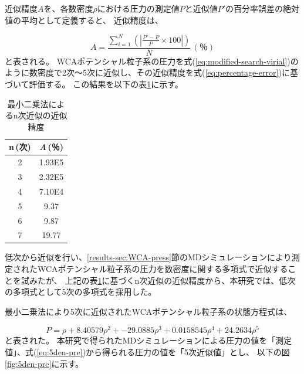 \documentclass[titlepage]{jsreport}
\begin{document}
{{{近似精度$A$を、各数密度$\rho$における圧力の測定値$P$と近似値$P'$の百分率誤差の絶対値の平均として定義すると、
近似精度は、

\large
\begin{equation}
    A=\frac{\sum_{i=1}^N\left(|\frac{P'-P}{P}\times100|\right)}{N}\,(％)\label{eq:percentage-error}
\end{equation}
\normalsize
と表される。
WCAポテンシャル粒子系の圧力を式(\ref{eq:modified-search-virial})のように数密度で2次〜5次に近似し、その近似精度を式(\ref{eq:percentage-error})に基づいて評価する。
この結果を以下の表\ref{table:approximation-accuracy}に示す。

\begin{table}[htbp]
    \begin{center}
        \caption{最小二乗法によるn次近似の近似精度}
        \label{table:approximation-accuracy}
            \begin{tabular}{c c}
                    n\,(次) & {\it{A}}\,(％) \\ \hline\hline
                    2 & 1.93E5 \\ 
                    3 & 2.32E5 \\ 
                    4 & 7.10E4\\ 
                    5 & 9.37\\ 
                    6 & 9.87 \\ 
                    7 & 19.77 \\ \hline
                
            \end{tabular}
    \end{center}
    
\end{table}

\newpage
低次から近似を行い、\ref{results-sec:WCA-press}節のMDシミュレーションにより測定されたWCAポテンシャル粒子系の圧力を数密度に関する多項式で近似することを試みたが、
上記の表\ref{table:approximation-accuracy}に基づくn次近似の近似精度から、本研究では、低次の多項式として5次の多項式を採用した。

最小二乗法により5次に近似されたWCAポテンシャル粒子系の状態方程式は、

\large
\begin{equation}
    P=\rho+8.40579\rho^2+-29.0885\rho^3+0.0158545\rho^4+24.2634\rho^5 \label{eq:5den-pre}
\end{equation}
\normalsize
と表された。
本研究で得られたMDシミュレーションによる圧力の値を「測定値」、式(\ref{eq:5den-pre})から得られる圧力の値を「5次近似値」とし、
以下の図\ref{fig:5den-pre}に示す。

}}}
\end{document}
